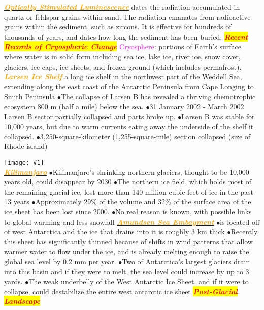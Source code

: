 \documentclass{article}
\newcommand{\ddd}{$\bullet$}
\newcommand{\red}[1]{\textcolor{red}{#1}}
\newcommand{\pink}[1]{\textcolor{magenta}{#1}}
\newcommand{\orange}[1]{\textcolor{orange}{#1}}
\newcommand{\mysection}[1]{\colorbox{yellow}{\textbf{\textit{\red{#1}}}}}
\newcommand{\mysub}[1]{\underline{\textbf{{\textit{\orange{#1}}}}}}
\newcommand{\vocab}[1]{{\pink{#1}}}
\newcommand{\fig}[1]{
	\texttt{[image: \#1]}
}
\begin{document}
\begin{multicols*}{4}
            \mysub{Optically Stimulated Luminescence} dates the radiation accumulated in quartz or feldspar grains within sand. The radiation emanates from radioactive grains within the sediment, such as zircons. It is effective for hundreds of thousands of years, and dates how long the sediment has been buried.
        \mysection{Recent Records of Cryospheric Change}
            \vocab{Cryosphere}: portions of Earth’s surface where water is in solid form including sea ice, lake ice, river ice, snow cover, glaciers, ice caps, ice sheets, and frozen ground (which includes permafrost).
            \mysub{Larsen Ice Shelf}
                a long ice shelf in the northwest part of the Weddell Sea, extending along the east coast of the Antarctic Peninsula from Cape Longing to Smith Peninsula
                \ddd The collapse of Larsen B has revealed a thriving chemotrophic ecosystem 800 m (half a mile) below the sea.
                \ddd 31 January 2002 - March 2002 Larsen B sector partially collapsed and parts broke up. 
                \ddd Larsen B was stable for 10,000 years, but due to warm currents eating away the underside of the shelf it collapsed. 
                \ddd 3,250-square-kilometer (1,255-square-mile) section collapsed (size of Rhode island)
                \fig{Larsen_contours} \\
            \mysub{Kilimanjaro}
                \ddd Kilimanjaro's shrinking northern glaciers, thought to be 10,000 years old, could disappear by 2030
                \ddd The northern ice field, which holds most of the remaining glacial ice, lost more than 140 million cubic feet of ice in the past 13 years
                \ddd Approximately 29\% of the volume and 32\% of the surface area of the ice sheet has been lost since 2000.
                \ddd No real reason is known, with possible links to global warming and less snowfall
            \mysub{Amundsen Sea Embayment}
                \ddd is located off of west Antarctica and the ice that drains into it is roughly 3 km thick
                \ddd Recently, this sheet has significantly thinned because of shifts in wind patterns that allow warmer water to flow under the ice, and is already melting enough to raise the global sea level by 0.2 mm per year. 
                \ddd Two of Antarctica's largest glaciers drain into this basin and if they were to melt, the sea level could increase by up to 3 yards. 
                \ddd The weak underbelly of the West Antarctic Ice Sheet, and if it were to collapse, could destabilize the entire west antarctic ice sheet
 	    \mysection{Post-Glacial Landscape}  

\end{multicols*}
\end{document}
